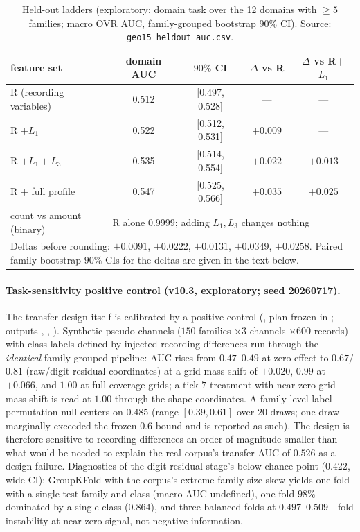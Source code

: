 \documentclass[12pt]{article}
\begin{document}
\begin{table}[t]
\centering
\caption{Held-out ladders (exploratory; domain task over the 12 domains with
$\ge5$ families; macro OVR AUC, family-grouped bootstrap $90\%$ CI). Source:
\texttt{geo15\_heldout\_auc.csv}.}
\label{tab:heldout}
\small
\begin{tabular}{lcccc}
\toprule
feature set & domain AUC & $90\%$ CI & $\Delta$ vs R & $\Delta$ vs R+$L_1$ \\
\midrule
R (recording variables) & 0.512 & [0.497, 0.528] & --- & --- \\
R $+ L_1$ & 0.522 & [0.512, 0.531] & $+0.009$ & --- \\
R $+ L_1 + L_3$ & 0.535 & [0.514, 0.554] & $+0.022$ & $+0.013$ \\
R $+$ full profile & 0.547 & [0.525, 0.566] & $+0.035$ & $+0.025$ \\
\midrule
count vs amount (binary) & \multicolumn{4}{l}{R alone $0.9999$; adding $L_1, L_3$ changes nothing} \\
\midrule
\multicolumn{5}{p{0.9\linewidth}}{\footnotesize Deltas before rounding:
$+0.0091$, $+0.0222$, $+0.0131$, $+0.0349$, $+0.0258$. Paired family-bootstrap
$90\%$ CIs for the deltas are given in the text below.} \\
\bottomrule
\end{tabular}
\end{table}

\paragraph{Task-sensitivity positive control (v10.3, exploratory; seed
20260717).} The transfer design itself is calibrated by a positive control
(, plan frozen in
; outputs ,
, ). Synthetic pseudo-channels ($150$
families $\times 3$ channels $\times 600$ records) with class labels defined
by injected recording differences run through the \emph{identical}
family-grouped pipeline: AUC rises from $0.47$--$0.49$ at zero effect to
$0.67$/$0.81$ (raw/digit-residual coordinates) at a grid-mass shift of
$+0.020$, $0.99$ at $+0.066$, and $1.00$ at full-coverage grids; a
tick-$7$ treatment with near-zero grid-mass shift is read at $1.00$ through
the shape coordinates. A family-level label-permutation null centers on
$0.485$ (range $[0.39, 0.61]$ over $20$ draws; one draw marginally exceeded
the frozen $0.6$ bound and is reported as such). The design is therefore
sensitive to recording differences an order of magnitude smaller than what
would be needed to explain the real corpus's transfer AUC of $0.526$ as a
design failure. Diagnostics of the digit-residual stage's below-chance point
($0.422$, wide CI): GroupKFold with the corpus's extreme family-size skew
yields one fold with a single test family and class (macro-AUC undefined),
one fold $98\%$ dominated by a single class ($0.864$), and three balanced
folds at $0.497$--$0.509$---fold instability at near-zero signal, not
negative information.
\end{document}
